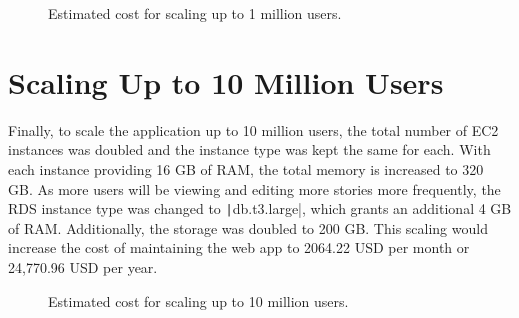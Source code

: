 \begin{figure}[!htbp]
    \centering
    \hfill
    \caption{Estimated cost for scaling up to 1 million users.}
    \label{fig:1-million-users}
\end{figure}

\clearpage
\section{Scaling Up to 10 Million Users}\label{sec:scaling-up-to-10-million-users}
Finally, to scale the application up to 10 million users, the total number of EC2 instances was doubled and the
instance type was kept the same for each.
With each instance providing 16 GB of RAM, the total memory is increased to 320 GB\@.
As more users will be viewing and editing more stories more frequently, the RDS instance type was changed to
\texttt|db.t3.large|, which grants an additional 4 GB of RAM\@.
Additionally, the storage was doubled to 200 GB\@.
This scaling would increase the cost of maintaining the web app to 2064.22 USD per month or 24,770.96 USD per year.

\begin{figure}[!htbp]
    \centering
    \hfill
    \caption{Estimated cost for scaling up to 10 million users.}
    \label{fig:10-million-users}
\end{figure}

